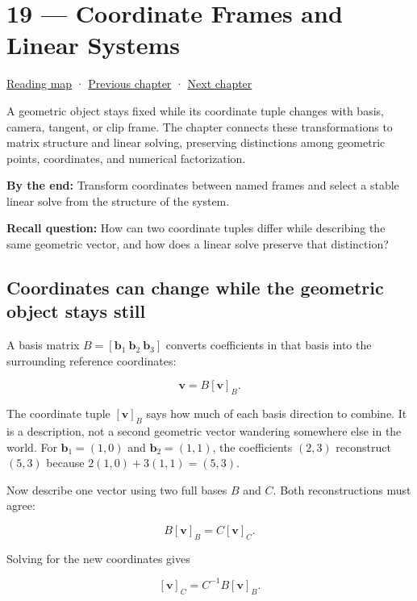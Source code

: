 \hypertarget{01-foundations-i-ch019}{}
\section{19 --- Coordinate Frames and Linear Systems}\label{coordinate-frames-and-linear-systems}

\href{Chapter\%20Edition/01\%20-\%20Computing\%20Foundations/00\%20-\%20Reading\%20Map}{Reading map} · \hyperref[01-foundations-i-ch018]{Previous chapter} · \hyperref[01-foundations-i-ch020]{Next chapter}

A geometric object stays fixed while its coordinate tuple changes with basis, camera, tangent, or clip frame. The chapter connects these transformations to matrix structure and linear solving, preserving distinctions among geometric points, coordinates, and numerical factorization.

\textbf{By the end:} Transform coordinates between named frames and select a stable linear solve from the structure of the system.

\textbf{Recall question:} How can two coordinate tuples differ while describing the same geometric vector, and how does a linear solve preserve that distinction?

\subsection{Coordinates can change while the geometric object stays still}\label{coordinates-can-change-while-the-geometric-object-stays-still}

A basis matrix \(B=[\mathbf b_1\ \mathbf b_2\ \mathbf b_3]\) converts coefficients in that basis into the surrounding reference coordinates:

\[
\mathbf v=B[\mathbf v]_B.
\]

The coordinate tuple \([\mathbf v]_B\) says how much of each basis direction to combine. It is a description, not a second geometric vector wandering somewhere else in the world. For \(\mathbf b_1=(1,0)\) and \(\mathbf b_2=(1,1)\), the coefficients \((2,3)\) reconstruct \((5,3)\) because \(2(1,0)+3(1,1)=(5,3)\).

Now describe one vector using two full bases \(B\) and \(C\). Both reconstructions must agree:

\[
B[\mathbf v]_B=C[\mathbf v]_C.
\]

Solving for the new coordinates gives

\[
[\mathbf v]_C=C^{-1}B[\mathbf v]_B.
\]

